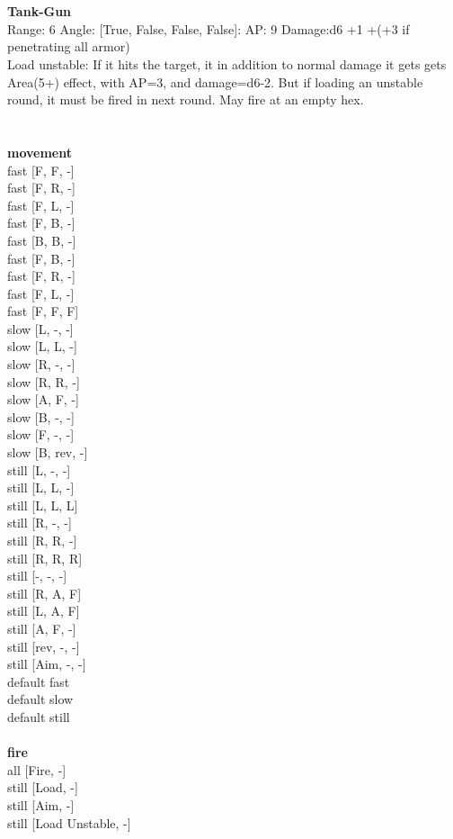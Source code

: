 \ \\

\ \\
{\bf Tank-Gun } \\



Range: 6  Angle: [True, False, False, False]: AP: 9 Damage:d6 +1 +(+3 if penetrating all armor) \\
Load unstable: If it hits the target, it in addition to normal damage it gets gets Area(5+) effect, with AP=3, and damage=d6-2. But if loading an unstable round, it must be fired in next round. May fire at an empty hex.\\ 




 
\ \\



\ \\ {\bf movement } \\
fast [F, F, -] \\
fast [F, R, -] \\
fast [F, L, -] \\
fast [F, B, -] \\
fast [B, B, -] \\
fast [F, B, -] \\
fast [F, R, -] \\
fast [F, L, -] \\
fast [F, F, F] \\
slow [L, -, -] \\
slow [L, L, -] \\
slow [R, -, -] \\
slow [R, R, -] \\
slow [A, F, -] \\
slow [B, -, -] \\
slow [F, -, -] \\
slow [B, rev, -] \\
still [L, -, -] \\
still [L, L, -] \\
still [L, L, L] \\
still [R, -, -] \\
still [R, R, -] \\
still [R, R, R] \\
still [-, -, -] \\
still [R, A, F] \\
still [L, A, F] \\
still [A, F, -] \\
still [rev, -, -] \\
still [Aim, -, -] \\
default fast \\
default slow \\
default still \\
\ \\ {\bf fire } \\
all [Fire, -] \\
still [Load, -] \\
still [Aim, -] \\
still [Load Unstable, -] \\



